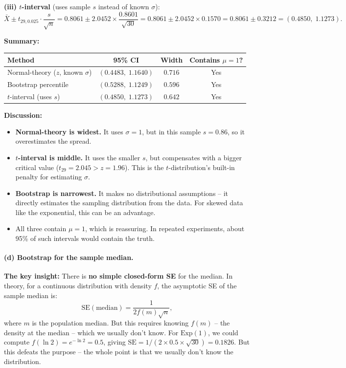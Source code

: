 \documentclass[11pt]{article}
\begin{document}
\textbf{(iii) $t$-interval} (uses sample $s$ instead of known $\sigma$):
\[
  \bar{X} \pm t_{29, 0.025} \cdot \frac{s}{\sqrt{n}}
  = 0.8061 \pm 2.0452 \times \frac{0.8601}{\sqrt{30}}
  = 0.8061 \pm 2.0452 \times 0.1570
  = 0.8061 \pm 0.3212
  = (0.4850,\; 1.1273).
\]

\textbf{Summary:}

\begin{center}
\begin{tabular}{@{}lccc@{}}
\toprule
\textbf{Method} & \textbf{95\% CI} & \textbf{Width} & \textbf{Contains $\mu=1$?} \\
\midrule
Normal-theory ($z$, known $\sigma$) & $(0.4483,\; 1.1640)$ & $0.716$ & Yes \\
Bootstrap percentile & $(0.5288,\; 1.1249)$ & $0.596$ & Yes \\
$t$-interval (uses $s$) & $(0.4850,\; 1.1273)$ & $0.642$ & Yes \\
\bottomrule
\end{tabular}
\end{center}

\textbf{Discussion:}
\begin{itemize}
  \item \textbf{Normal-theory is widest.} It uses $\sigma = 1$, but in this sample $s = 0.86$, so it overestimates the spread.
  \item \textbf{$t$-interval is middle.} It uses the smaller $s$, but compensates with a bigger critical value ($t_{29} = 2.045 > z = 1.96$). This is the $t$-distribution's built-in penalty for estimating $\sigma$.
  \item \textbf{Bootstrap is narrowest.} It makes no distributional assumptions -- it directly estimates the sampling distribution from the data. For skewed data like the exponential, this can be an advantage.
  \item All three contain $\mu = 1$, which is reassuring. In repeated experiments, about 95\% of such intervals would contain the truth.
\end{itemize}

\paragraph{(d) Bootstrap for the sample median.}

\textbf{The key insight:} There is \textbf{no simple closed-form SE} for the median. In theory, for a continuous distribution with density $f$, the asymptotic SE of the sample median is:
\[
  \text{SE}(\text{median}) = \frac{1}{2f(m)\sqrt{n}},
\]
where $m$ is the population median. But this requires knowing $f(m)$ -- the density at the median -- which we usually don't know. For $\text{Exp}(1)$, we could compute $f(\ln 2) = e^{-\ln 2} = 0.5$, giving $\text{SE} = 1/(2 \times 0.5 \times \sqrt{30}) = 0.1826$. But this defeats the purpose -- the whole point is that we usually don't know the distribution.
\end{document}
